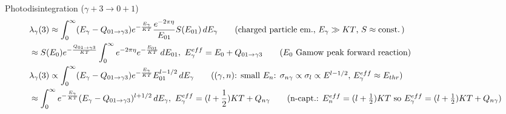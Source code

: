 \begin{frame}{Photodisintegration ($\gamma+3\to0+1$)}
\begin{align*}
    &\lambda_{\gamma}(3)\approx\int_0^{\infty}(E_{\gamma}-Q_{01\to\gamma3})\exp{-\frac{E_{\gamma}}{KT}}\frac{\exp{-2\pi\eta}}{E_{01}}S(E_{01})\,dE_{\gamma}\tag{charged particle em., $E_{\gamma}\gg KT$, $S\approx\const{}$}\\
    &\approx S(E_0)\exp{-\frac{Q_{01\to\gamma3}}{KT}}\int_0^{\infty}\exp{-2\pi\eta}\exp{-\frac{E_{01}}{KT}}\,dE_{01},\ E_{\gamma}^{eff}=E_0+Q_{01\to\gamma3}\tag{$E_0$ Gamow peak forward reaction}\\
    &\lambda_{\gamma}(3)\propto\int_0^{\infty}(E_{\gamma}-Q_{01\to\gamma3})\exp{-\frac{E_{\gamma}}{KT}}E_{01}^{l-1/2}\,dE_{\gamma}\tag{$(\gamma,n)$: small $E_n$: $\sigma_{n\gamma}\propto\sigma_l\propto E^{l-1/2}$, $E_{\gamma}^{eff}\approx E_{thr}$}\\
    &\approx\int_0^{\infty}\exp{-\frac{E_{\gamma}}{KT}}(E_{\gamma}-Q_{01\to\gamma3})^{l+1/2}\,dE_{\gamma},\ E^{eff}_{\gamma}=(l+\frac{1}{2})KT+Q_{n\gamma}\tag{n-capt.: $E_n^{eff}=(l+\frac{1}{2})KT$ so $E_{\gamma}^{eff}=(l+\frac{1}{2})KT+Q_{n\gamma}$}
    \end{align*}
\end{frame}

